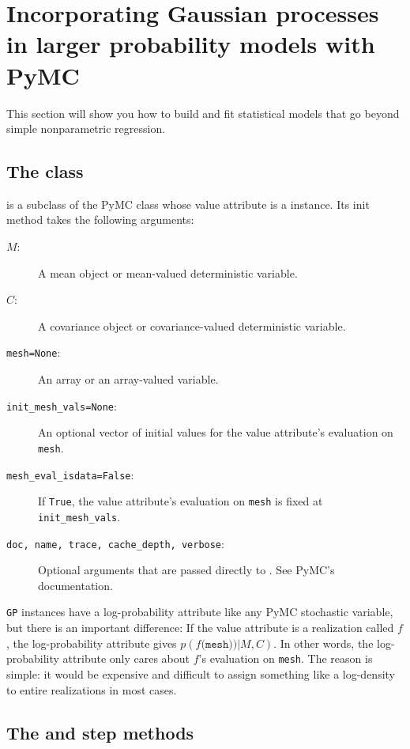 \documentclass[]{manual}
\begin{document}
\section{Incorporating Gaussian processes in larger probability models with PyMC}\label{sec:PyMC} 

This section will show you how to build and fit statistical models that go beyond simple nonparametric regression.

\subsection{The  class}
 is a subclass of the PyMC  class whose value attribute is a  instance. Its init method takes the following arguments:
\begin{description}
    \item[$M$:] A mean object or mean-valued deterministic variable.
    \item[$C$:] A covariance object or covariance-valued deterministic variable.
    \item[\texttt{mesh=None}:] An array or an array-valued variable.
    \item[\texttt{init_mesh_vals=None}:] An optional vector of initial values for the value attribute's evaluation on \texttt{mesh}.
    \item[\texttt{mesh_eval_isdata=False}:] If \texttt{True}, the value attribute's evaluation on \texttt{mesh} is fixed at \texttt{init_mesh_vals}.
    \item[\texttt{doc, name, trace, cache_depth, verbose}:] Optional arguments that are passed directly to . See PyMC's documentation.
\end{description}

\texttt{GP} instances have a log-probability attribute like any PyMC stochastic variable, but there is an important difference: If the value attribute is a realization called $f$, the log-probability attribute gives $p(f\texttt{(mesh))}|M,C)$. In other words, the log-probability attribute only cares about $f$'s evaluation on \texttt{mesh}. The reason is simple: it would be expensive and difficult to assign something like a log-density to entire realizations in most cases. 

\subsection{The  and  step methods}
\end{document}
